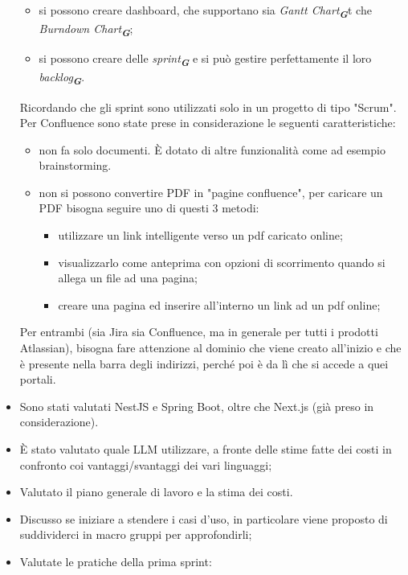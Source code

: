 \begin{itemize}
\begin{itemize}
    \item si possono creare dashboard, che supportano sia \emph{Gantt Chart}\textsubscript{\textit{\textbf{G}}}t che \emph{Burndown Chart}\textsubscript{\textit{\textbf{G}}};
    \item si possono creare delle \emph{sprint}\textsubscript{\textit{\textbf{G}}} e si può gestire perfettamente il loro \emph{backlog}\textsubscript{\textit{\textbf{G}}}.
    \end{itemize}
    Ricordando che gli sprint sono utilizzati solo in un progetto di tipo "Scrum".
    Per Confluence sono state prese in considerazione le seguenti caratteristiche:
    \begin{itemize}
        \item non fa solo documenti. È dotato di altre funzionalità come ad esempio brainstorming.
        \item non si possono convertire PDF in "pagine confluence", per caricare un PDF bisogna seguire uno di questi 3  metodi:
        \begin{itemize}
            \item utilizzare un link intelligente verso un pdf caricato online;
            \item visualizzarlo come anteprima con opzioni di scorrimento quando si allega un file ad una pagina;
            \item creare una pagina ed inserire all'interno un link ad un pdf online;
        \end{itemize}
    \end{itemize}
    Per entrambi (sia Jira sia Confluence, ma in generale per tutti i prodotti Atlassian), bisogna fare attenzione al dominio che viene creato all'inizio e che è presente nella barra degli indirizzi, perché poi è da lì che si accede a quei portali.
    \item Sono stati valutati NestJS e Spring Boot, oltre che Next.js (già preso in considerazione).
    \item È stato valutato quale LLM utilizzare, a fronte delle stime fatte dei costi in confronto coi vantaggi/svantaggi dei vari linguaggi;
    \item Valutato il piano generale di lavoro e la stima dei costi.
    \item Discusso se iniziare a stendere i casi d'uso, in particolare viene proposto di suddividerci in macro gruppi per approfondirli;
    \item Valutate le pratiche della prima sprint:
    \begin{itemize}

\end{itemize}
\end{itemize}

